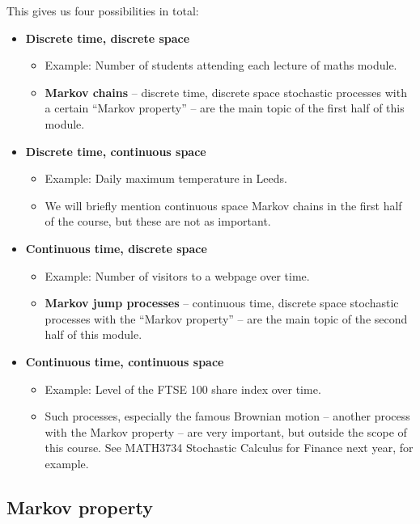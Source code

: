 \documentclass[
  a4paper,
]{article}
\providecommand{\tightlist}{%
  \setlength{\itemsep}{0pt}\setlength{\parskip}{0pt}}
\theoremstyle{definition}
\theoremstyle{definition}
\theoremstyle{definition}
\theoremstyle{remark}
\begin{document}
This gives us four possibilities in total:

\begin{itemize}
\tightlist
\item
  \textbf{Discrete time, discrete space}

  \begin{itemize}
  \tightlist
  \item
    Example: Number of students attending each lecture of maths module.
  \item
    \textbf{Markov chains} -- discrete time, discrete space stochastic processes with a certain ``Markov property'' -- are the main topic of the first half of this module.
  \end{itemize}
\item
  \textbf{Discrete time, continuous space}

  \begin{itemize}
  \tightlist
  \item
    Example: Daily maximum temperature in Leeds.
  \item
    We will briefly mention continuous space Markov chains in the first half of the course, but these are not as important.
  \end{itemize}
\item
  \textbf{Continuous time, discrete space}

  \begin{itemize}
  \tightlist
  \item
    Example: Number of visitors to a webpage over time.
  \item
    \textbf{Markov jump processes} -- continuous time, discrete space stochastic processes with the ``Markov property'' -- are the main topic of the second half of this module.
  \end{itemize}
\item
  \textbf{Continuous time, continuous space}

  \begin{itemize}
  \tightlist
  \item
    Example: Level of the FTSE 100 share index over time.
  \item
    Such processes, especially the famous Brownian motion -- another process with the Markov property -- are very important, but outside the scope of this course. See MATH3734 Stochastic Calculus for Finance next year, for example.
  \end{itemize}
\end{itemize}

\hypertarget{markov-property}{%
\subsection{Markov property}\label{markov-property}}
\end{document}
